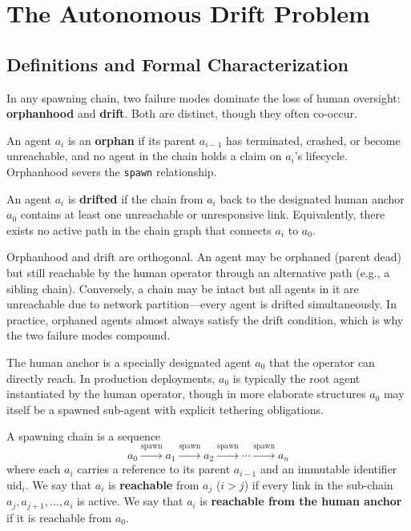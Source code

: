 \section{The Autonomous Drift Problem}

\subsection{Definitions and Formal Characterization}

In any spawning chain, two failure modes dominate the loss of human oversight: \textbf{orphanhood} and \textbf{drift}. Both are distinct, though they often co-occur.

\begin{definition}
An agent $a_i$ is an \textbf{orphan} if its parent $a_{i-1}$ has terminated, crashed, or become unreachable, and no agent in the chain holds a claim on $a_i$'s lifecycle. Orphanhood severs the \texttt{spawn} relationship.
\end{definition}

\begin{definition}
An agent $a_i$ is \textbf{drifted} if the chain from $a_i$ back to the designated human anchor $a_0$ contains at least one unreachable or unresponsive link. Equivalently, there exists no active path in the chain graph that connects $a_i$ to $a_0$.
\end{definition}

\begin{note}
Orphanhood and drift are orthogonal. An agent may be orphaned (parent dead) but still reachable by the human operator through an alternative path (e.g., a sibling chain). Conversely, a chain may be intact but all agents in it are unreachable due to network partition—every agent is drifted simultaneously. In practice, orphaned agents almost always satisfy the drift condition, which is why the two failure modes compound.
\end{note}

The human anchor is a specially designated agent $a_0$ that the operator can directly reach. In production deployments, $a_0$ is typically the root agent instantiated by the human operator, though in more elaborate structures $a_0$ may itself be a spawned sub-agent with explicit tethering obligations.

A spawning chain is a sequence
\[
a_0 \xrightarrow{\text{spawn}} a_1 \xrightarrow{\text{spawn}} a_2 \xrightarrow{\text{spawn}} \cdots \xrightarrow{\text{spawn}} a_n
\]
where each $a_i$ carries a reference to its parent $a_{i-1}$ and an immutable identifier $\text{uid}_i$. We say that $a_i$ is \textbf{reachable} from $a_j$ ($i > j$) if every link in the sub-chain $a_j, a_{j+1}, \ldots, a_i$ is active. We say that $a_i$ is \textbf{reachable from the human anchor} if it is reachable from $a_0$.

